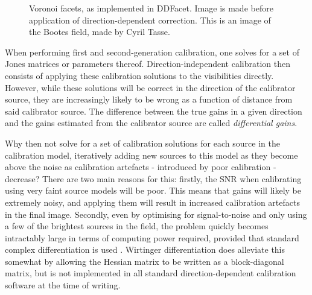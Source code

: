 \begin{figure}[ht]
\centering
{}
\caption{\label{fig.facets} Voronoi facets, as implemented in DDFacet. Image is made before application of direction-dependent correction. This is an image of the Bootes field, made by Cyril Tasse.}
\end{figure}

\pg
When performing first and second-generation calibration, one solves for a set of Jones matrices or parameters thereof. Direction-independent calibration then consists of applying these calibration solutions to the visibilities directly. However, while these solutions will be correct in the direction of the calibrator source, they are increasingly likely to be wrong as a function of distance from said calibrator source. The difference between the true gains in a given direction and the gains estimated from the calibrator source are called \emph{differential gains}.

\pg
Why then not solve for a set of calibration solutions for each source in the calibration model, iteratively adding new sources to this model as they become above the noise as calibration artefacts - introduced by poor calibration - decrease? There are two main reasons for this: firstly, the SNR when calibrating using very faint source models will be poor. This means that gains will likely be extremely noisy, and applying them will result in increased calibration artefacts in the final image. Secondly, even by optimising for signal-to-noise and only using a few of the brightest sources in the field, the problem quickly becomes intractably large in terms of computing power required, provided that standard complex differentiation is used . Wirtinger differentiation  does alleviate this somewhat by allowing the Hessian matrix to be written as a block-diagonal matrix, but is not implemented in all standard direction-dependent calibration software at the time of writing.

